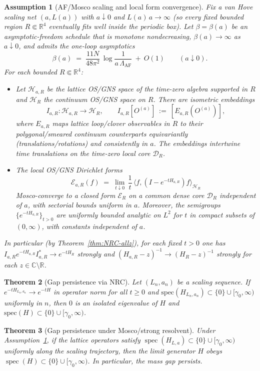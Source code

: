 \documentclass[11pt]{amsart}
\theoremstyle{plain}
\newtheorem{theorem}{Theorem}[section]
\newtheorem{assumption}[theorem]{Assumption}
\theoremstyle{definition}
\theoremstyle{remark}
\begin{document}
\begin{assumption}[AF/Mosco scaling and local form convergence]\label{assump:AF-Mosco}
Fix a van Hove scaling net $(a,L(a))$ with $a\downarrow 0$ and $L(a)\,a\to\infty$ (so every fixed bounded region $R\Subset\mathbb R^4$ eventually fits well inside the periodic box). Let $\beta=\beta(a)$ be an asymptotic-freedom schedule that is monotone nondecreasing, $\beta(a)\to\infty$ as $a\downarrow 0$, and admits the one-loop asymptotics
\[
  \beta(a)\;=\; \frac{11N}{48\pi^2}\,\log\frac{1}{a\,\Lambda_{\mathrm{AF}}}\ +\ O(1)\qquad (a\downarrow 0).
\]
For each bounded $R\Subset\mathbb R^4$:
\begin{itemize}
  \item[(i)] Let $\mathcal H_{a,R}$ be the lattice OS/GNS space of the time-zero algebra supported in $R$ and $\mathcal H_R$ the continuum OS/GNS space on $R$. There are isometric embeddings
  \[
    I_{a,R}:\mathcal H_{a,R}\to\mathcal H_R,\qquad I_{a,R}[O^{(a)}]\ :=\ [E_{a,R}(O^{(a)})],
  \]
  where $E_{a,R}$ maps lattice loop/clover observables in $R$ to their polygonal/smeared continuum counterparts equivariantly (translations/rotations) and consistently in $a$. The embeddings intertwine time translations on the time-zero local core $\mathcal D_R$.
  \item[(ii)] The local OS/GNS Dirichlet forms
  \[
    \mathcal E_{a,R}(f)\;=\; \lim_{t\downarrow 0}\,\frac{1}{t}\,\langle f,(I-e^{-tH_{a,R}})f\rangle_{\mathcal H_R}
  \]
  Mosco-converge to a closed form $\mathcal E_R$ on a common dense core $\mathcal D_R$ independent of $a$, with sectorial bounds uniform in $a$. Moreover, the semigroups $\{e^{-t H_{a,R}}\}_{t>0}$ are uniformly bounded analytic on $L^2$ for $t$ in compact subsets of $(0,\infty)$, with constants independent of $a$.
\end{itemize}
In particular (by Theorem~\ref{thm:NRC-allz}), for each fixed $t>0$ one has $I_{a,R}e^{-tH_{a,R}}I_{a,R}^*\to e^{-tH_R}$ strongly and $(H_{a,R}-z)^{-1}\to (H_R-z)^{-1}$ strongly for each $z\in\mathbb C\setminus\mathbb R$.
\end{assumption}
\begin{theorem}[Gap persistence via NRC]\label{thm:gap-persist}
Let $(L_n,a_n)$ be a scaling sequence. If $e^{-tH_{L_n,a_n}}\to e^{-tH}$ in operator norm for all $t\ge 0$ and $\mathrm{spec}(H_{L_n,a_n})\subset\{0\}\cup[\gamma_0,\infty)$ uniformly in $n$, then $0$ is an isolated eigenvalue of $H$ and $\mathrm{spec}(H)\subset\{0\}\cup[\gamma_0,\infty)$.
\end{theorem}
\begin{theorem}[Gap persistence under Mosco/strong resolvent]\label{thm:gap-persist-mosco}
Under Assumption~\ref{assump:AF-Mosco}, if the lattice operators satisfy $\operatorname{spec}(H_{L,a})\subset\{0\}\cup[\gamma_0,\infty)$ uniformly along the scaling trajectory, then the limit generator $H$ obeys $\operatorname{spec}(H)\subset\{0\}\cup[\gamma_0,\infty)$. In particular, the mass gap persists.
\end{theorem}
\end{document}
